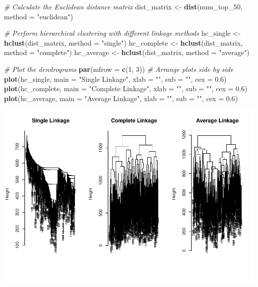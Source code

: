 \documentclass[
]{article}
\newenvironment{Shaded}{\begin{snugshade}}{\end{snugshade}}
\newcommand{\AttributeTok}[1]{\textcolor[rgb]{0.13,0.29,0.53}{#1}}
\newcommand{\CommentTok}[1]{\textcolor[rgb]{0.56,0.35,0.01}{\textit{#1}}}
\newcommand{\DecValTok}[1]{\textcolor[rgb]{0.00,0.00,0.81}{#1}}
\newcommand{\FloatTok}[1]{\textcolor[rgb]{0.00,0.00,0.81}{#1}}
\newcommand{\FunctionTok}[1]{\textcolor[rgb]{0.13,0.29,0.53}{\textbf{#1}}}
\newcommand{\NormalTok}[1]{#1}
\newcommand{\OtherTok}[1]{\textcolor[rgb]{0.56,0.35,0.01}{#1}}
\newcommand{\StringTok}[1]{\textcolor[rgb]{0.31,0.60,0.02}{#1}}
\begin{document}
\begin{Shaded}
\begin{Highlighting}[]
\CommentTok{\# Calculate the Euclidean distance matrix}
\NormalTok{dist\_matrix }\OtherTok{\textless{}{-}} \FunctionTok{dist}\NormalTok{(num\_top\_50, }\AttributeTok{method =} \StringTok{"euclidean"}\NormalTok{)}

\CommentTok{\# Perform hierarchical clustering with different linkage methods}
\NormalTok{hc\_single }\OtherTok{\textless{}{-}} \FunctionTok{hclust}\NormalTok{(dist\_matrix, }\AttributeTok{method =} \StringTok{"single"}\NormalTok{)}
\NormalTok{hc\_complete }\OtherTok{\textless{}{-}} \FunctionTok{hclust}\NormalTok{(dist\_matrix, }\AttributeTok{method =} \StringTok{"complete"}\NormalTok{)}
\NormalTok{hc\_average }\OtherTok{\textless{}{-}} \FunctionTok{hclust}\NormalTok{(dist\_matrix, }\AttributeTok{method =} \StringTok{"average"}\NormalTok{)}

\CommentTok{\# Plot the dendrograms}
\FunctionTok{par}\NormalTok{(}\AttributeTok{mfrow =} \FunctionTok{c}\NormalTok{(}\DecValTok{1}\NormalTok{, }\DecValTok{3}\NormalTok{))  }\CommentTok{\# Arrange plots side by side}
\FunctionTok{plot}\NormalTok{(hc\_single, }\AttributeTok{main =} \StringTok{"Single Linkage"}\NormalTok{, }\AttributeTok{xlab =} \StringTok{""}\NormalTok{, }\AttributeTok{sub =} \StringTok{""}\NormalTok{, }\AttributeTok{cex =} \FloatTok{0.6}\NormalTok{)}
\FunctionTok{plot}\NormalTok{(hc\_complete, }\AttributeTok{main =} \StringTok{"Complete Linkage"}\NormalTok{, }\AttributeTok{xlab =} \StringTok{""}\NormalTok{, }\AttributeTok{sub =} \StringTok{""}\NormalTok{, }\AttributeTok{cex =} \FloatTok{0.6}\NormalTok{)}
\FunctionTok{plot}\NormalTok{(hc\_average, }\AttributeTok{main =} \StringTok{"Average Linkage"}\NormalTok{, }\AttributeTok{xlab =} \StringTok{""}\NormalTok{, }\AttributeTok{sub =} \StringTok{""}\NormalTok{, }\AttributeTok{cex =} \FloatTok{0.6}\NormalTok{)}
\end{Highlighting}
\end{Shaded}

\includegraphics{Version-2_files/figure-latex/unnamed-chunk-10-1.pdf}
\end{document}
